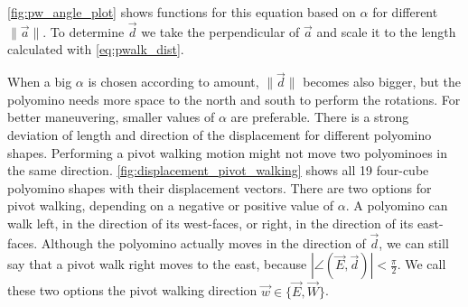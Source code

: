 \autoref{fig:pw_angle_plot} shows functions for this equation based on $\alpha$ for different $\lVert \vec{a} \rVert$.
To determine $\vec{d}$ we take the perpendicular of $\vec{a}$ and scale it to the length calculated with \autoref{eq:pwalk_dist}.

When a big $\alpha$ is chosen according to amount, $\lVert \vec{d} \rVert$ becomes also bigger, but the polyomino needs more space to the north and south to perform the rotations.
For better maneuvering, smaller values of $\alpha$ are preferable.
There is a strong deviation of length and direction of the displacement for different polyomino shapes.
Performing a pivot walking motion might not move two polyominoes in the same direction.
\autoref{fig:displacement_pivot_walking} shows all 19 four-cube polyomino shapes with their displacement vectors.
There are two options for pivot walking, depending on a negative or positive value of $\alpha$.
A polyomino can walk left, in the direction of its west-faces, or right, in the direction of its east-faces.
Although the polyomino actually moves in the direction of $\vec{d}$, we can still say that a pivot walk right moves to the east, because $\left| \angle \left( \vec{E}, \vec{d} \right) \right| < \frac{\pi}{2}$.
We call these two options the pivot walking direction $\vec{w} \in \{\vec{E}, \vec{W}\}$.
